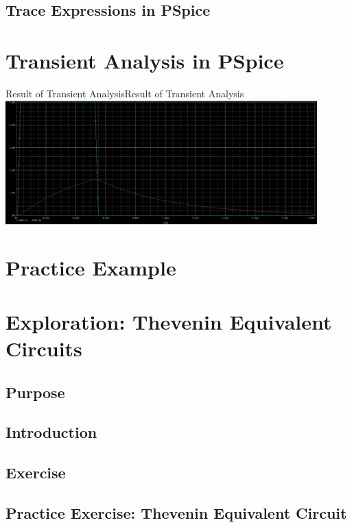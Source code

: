 \documentclass[12pt]{../manual}
\begin{document}
\subsection{Trace Expressions in PSpice}

\section{Transient Analysis in PSpice}

\begin{myfigure}[label=fig:TransAnalRes]{Result of Transient Analysis}{Result of Transient Analysis}
\centering
\includegraphics[width=0.9\textwidth]{figures/ResultTransientAnalysisCrop.PNG}
\end{myfigure}

\section{Practice Example}

\section{Exploration: Thevenin Equivalent Circuits}
\subsection{Purpose}
\subsection{Introduction}
\subsection{Exercise}
\subsection{Practice Exercise: Thevenin Equivalent Circuit}

\newpage
{} %
\end{document}
